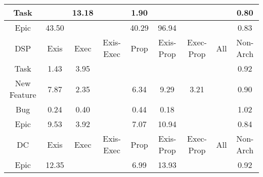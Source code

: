 \begin{tabular}{|c||c|c|c|c|c|c|c|c|}
\hline
Task &  & \cellcolor[rgb]{0.861749746079258,0.8171446165638591,0.42} 13.18 &  & \cellcolor[rgb]{0.9064377527071029,0.8383126197033645,0.42} 1.90 &  &  &  & \cellcolor[rgb]{0.878644629777828,0.6915845809483857,0.39073498779263943} 0.80 \\ 
\hline
Epic & \cellcolor[rgb]{0.741646740245932,0.7602537190638625,0.42} 43.50 &  &  & \cellcolor[rgb]{0.7543626948390212,0.7662770659763785,0.42} 40.29 & \cellcolor[rgb]{0.53,0.66,0.42} 96.94 &  &  & \cellcolor[rgb]{0.882786054797027,0.7111873260392607,0.39460031781055843} 0.83 \\ 
\hline
\hline
DSP & Exis & Exec & Exis-Exec & Prop & Exis-Prop & Exec-Prop & All & Non-Arch \\ 
\hline
Task & \cellcolor[rgb]{0.9082890066705531,0.839189529475525,0.42} 1.43 & \cellcolor[rgb]{0.8983302127141627,0.834472206022498,0.42} 3.95 &  &  &  &  &  & \cellcolor[rgb]{0.8978520623615065,0.7824997618444641,0.4086619248707394} 0.92 \\ 
\hline
New Feature & \cellcolor[rgb]{0.8827794390566758,0.8271060500794779,0.42} 7.87 & \cellcolor[rgb]{0.9046392108494011,0.8374606788234005,0.42} 2.35 &  & \cellcolor[rgb]{0.8888566561795633,0.8299847318745299,0.42} 6.34 & \cellcolor[rgb]{0.8771482954531471,0.8244386662672801,0.42} 9.29 & \cellcolor[rgb]{0.9012467203979951,0.8358537096622082,0.42} 3.21 &  & \cellcolor[rgb]{0.8939411391001019,0.7639880584071488,0.4050117298267617} 0.90 \\ 
\hline
Bug & \cellcolor[rgb]{0.7904145440394292,0.2739621751199648,0.3083869077701339} 0.24 & \cellcolor[rgb]{0.8163420393651244,0.39668565299492164,0.3325859034074493} 0.40 &  & \cellcolor[rgb]{0.8222606797307122,0.42470055072537055,0.33810996774866464} 0.44 & \cellcolor[rgb]{0.7814271765651797,0.2314219690751839,0.2999986981275011} 0.18 &  &  & \cellcolor[rgb]{0.9099107454107832,0.839957721510371,0.42} 1.02 \\ 
\hline
Epic & \cellcolor[rgb]{0.8762200455647505,0.8239989689517239,0.42} 9.53 & \cellcolor[rgb]{0.8984386476413201,0.834523569935362,0.42} 3.92 &  & \cellcolor[rgb]{0.8859695841917774,0.828617171459263,0.42} 7.07 & \cellcolor[rgb]{0.8706437947781407,0.8213575870001718,0.42} 10.94 &  &  & \cellcolor[rgb]{0.8855926014531642,0.7244716468783104,0.39721976135628656} 0.84 \\ 
\hline
\hline
DC & Exis & Exec & Exis-Exec & Prop & Exis-Prop & Exec-Prop & All & Non-Arch \\ 
\hline
Epic & \cellcolor[rgb]{0.8650387770209386,0.8187025785888655,0.42} 12.35 &  &  & \cellcolor[rgb]{0.8862711224055839,0.8287600053500135,0.42} 6.99 & \cellcolor[rgb]{0.8587706299570821,0.8157334562954599,0.42} 13.93 &  &  & \cellcolor[rgb]{0.8968135168138044,0.7775839795853408,0.40769261569288406} 0.92 \\ 

\end{tabular}
